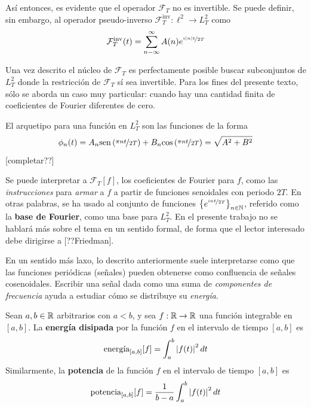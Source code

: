 Así entonces, es evidente que el operador $\mathcal{F}_T$ no es invertible.
%
Se puede definir, sin embargo, al operador pseudo-inverso $\mathcal{F}_{T}^{\text{inv}} : \ell^{2} \rightarrow L^{2}_T$ como
\begin{equation}
\mathcal{F}_{T}^{\text{inv}}(t) = \sum_{n -\infty}^{\infty} A(n) e^{\nicefrac{i \left| n \right| t}{2 T}}
\end{equation}

Una vez descrito el núcleo de $\mathcal{F}_{T}$ es perfectamente posible buscar subconjuntos de $L^{2}_T$ donde la restricción de $\mathcal{F}_{T}$ sí sea invertible.
%
Para los fines del presente texto, sólo se aborda un caso muy particular: cuando hay una cantidad finita de coeficientes de Fourier diferentes de cero.

El arquetipo para una función en $L^{2}_T$ son las funciones de la forma
\begin{equation}
\phi_n(t) = A_n \mathrm{sen}\left( \nicefrac{\pi n t }{2T} \right) + B_n \mathrm{cos}\left( \nicefrac{\pi n t }{2T} \right)
= \sqrt{A^{2}+B^{2}} 
\end{equation}
[completar??]

Se puede interpretar a $\mathcal{F}_{T}[f]$, los coeficientes de Fourier para $f$, como las \textit{instrucciones} para \textit{armar} a $f$ a partir de funciones senoidales con periodo $2T$.
%
En otras palabras, se ha usado al conjunto de funciones $\left\{ e^{\nicefrac{i {n} t}{2 T}} \right\}_{n\in \mathbb{N}}$, referido como la \textbf{base de Fourier}, como una base para $L^{2}_T$.
%
En el presente trabajo no se hablará más sobre el tema en un sentido formal, de forma que el lector interesado debe dirigirse a [??Friedman].

En un sentido más laxo, lo descrito anteriormente suele interpretarse como que las funciones periódicas (señales) pueden obtenerse como confluencia de señales cosenoidales.
%
Escribir una señal dada como una suma de \textit{componentes de frecuencia} ayuda a estudiar cómo se distribuye su \textit{energía}.

\begin{definicion}
Sean $a,b \in \mathbb{R}$ arbitrarios con $a<b$, y sea $f: \mathbb{R} \rightarrow \mathbb{R}$ una función integrable en $[a,b]$. La \textbf{energía disipada} por la función $f$ en el intervalo de tiempo $[a,b]$ es
\begin{equation}
\text{energía}_{[a,b]}[f] = \int_a^{b} \left| f(t) \right|^{2} dt
\end{equation}
Similarmente, la \textbf{potencia} de la función $f$ en el intervalo de tiempo $[a,b]$ es
\begin{equation}
\text{potencia}_{[a,b]}[f] = \frac{1}{b-a} \int_a^{b} \left| f(t) \right|^{2} dt
\end{equation}
\end{definicion}

